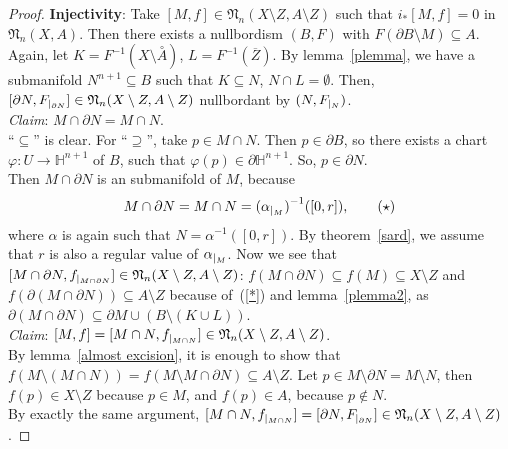 \documentclass[a4paper,11pt]{article}
\begin{document}
\begin{proof}
    \noindent\textbf{Injectivity}: Take \([M,f]\in\mathfrak{N}_n(X\setminus Z, A\setminus Z)\) such that \(i_\ast[M,f]=0\) in \(\mathfrak{N}_n(X,A)\). Then there exists %
    a nullbordism \((B,F)\) with \(F(\partial B\setminus M)\subseteq A\).\\
    Again, let \(K=F^{-1}(X\setminus\overset{\circ}A)\), \(L=F^{-1}(\overline{Z})\). By lemma\ \ref{plemma}, we have a submanifold \(N^{n+1}\subseteq B\) such that \(K\subseteq N\), \(N\cap L=\emptyset\). Then, \([\partial N,F_{|_{\partial N}}]\in\mathfrak{N}_n(X\setminus Z, A\setminus Z)\) nullbordant by \((N,F_{|_{N}})\).\\
    \emph{Claim}: \(M\cap\partial N=M\cap N\).\\
    \enquote{\(\subseteq\)} is clear. For \enquote{\(\supseteq\)}, take \(p\in M\cap N\). Then \(p\in\partial B\), so there exists a chart \(\varphi:U\to\mathbb{H}^{n+1}\) of \(B\), such that \(\varphi(p)\in\partial\mathbb{H}^{n+1}\). So, \(p\in\partial N\).\\
    Then \(M\cap\partial N\) is an submanifold of \(M\), because
    \begin{equation}\label{*}
        M\cap\partial N= M\cap N={(\alpha_{|_{M}})}^{-1}([0,r]),\tag{$\star$}
    \end{equation}
    where \(\alpha\) is again such that \(N=\alpha^{-1}([0,r])\). 
    By theorem\ \ref{sard}, we assume that \(r\) is also a regular value of \(\alpha_{|_{M}}\). Now we see that \([M\cap\partial N,f_{|_{M\cap\partial N}}]\in\mathfrak{N}_n(X\setminus Z,A\setminus Z)\): \(f(M\cap\partial N)\subseteq f(M)\subseteq X\setminus Z\) and \(f(\partial(M\cap\partial N))\subseteq A\setminus Z\) because of\ (\ref{*}) and lemma\ \ref{plemma2}, as \(\partial(M\cap\partial N)\subseteq\partial M\cup(B\setminus (K\cup L))\).\\
    \textit{Claim}: 
    \([M,f]=[M\cap N,f_{|_{M\cap N}}]\in\mathfrak{N}_n(X\setminus Z,A\setminus Z)\). \\
    By lemma\ \ref{almost excision}, it is enough to show that 
    \(f(M\setminus(M\cap N))=f(M\setminus M\cap \partial N)\subseteq A\setminus Z\). 
    Let \(p\in M\setminus\partial N=M\setminus N\), then \(f(p)\in X\setminus Z\) because \(p\in M\), and \(f(p)\in A\), because \(p\notin N\).\\
    By exactly the same argument, \([M\cap N,f_{|_{M\cap N}}]=[\partial N,F_{|_{\partial N}}]\in\mathfrak{N}_n(X\setminus Z,A\setminus Z)\). 

\end{proof}
\end{document}
